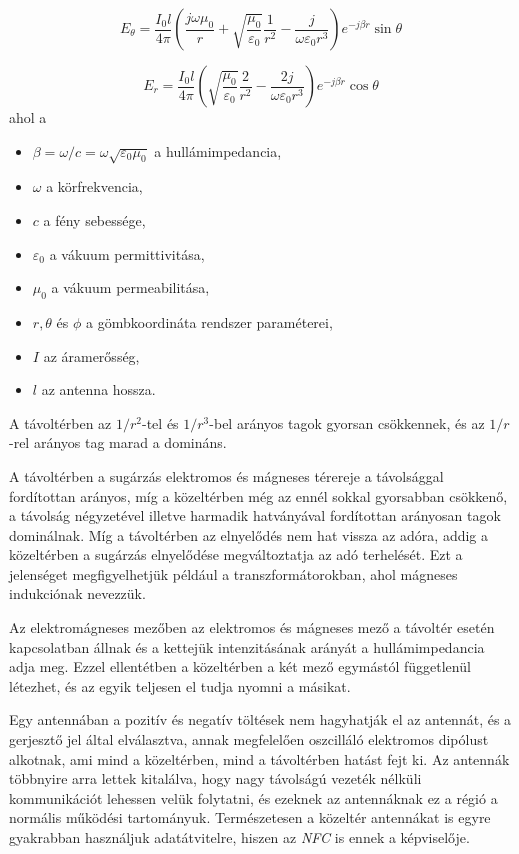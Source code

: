 \documentclass[12pt]{article}
\begin{document}
\begin{equation}
E_{\theta} = \frac{I_0 l}{4 \pi}
\left( \frac{j\omega \mu_0}{r}
+ \sqrt{\frac{\mu_0}{\varepsilon_0}}\frac{1}{r^2}
- \frac{j}{\omega \varepsilon_0 r^3} \right)
e^{-j\beta r} \sin \theta
\end{equation}

\begin{equation}
E_{r} = \frac{I_0 l}{4 \pi}
\left( \sqrt{\frac{\mu_0}{\varepsilon_0}} \frac{2}{r^2}
- \frac{2j}{\omega \varepsilon_0 r^3}\right)
e^{-j\beta r} \cos \theta
\end{equation}
ahol a 
\begin{itemize}
\item $\beta = \omega /c = \omega \sqrt{\varepsilon_0 \mu_0}$ a hullámimpedancia,
\item $\omega$ a körfrekvencia,
\item $c$ a fény sebessége,
\item $\varepsilon_0$ a vákuum permittivitása,
\item $\mu_0$ a vákuum permeabilitása,
\item $r, \theta$ és  $\phi$ a gömbkoordináta rendszer paraméterei,
\item $I$ az áramerősség,
\item $l$ az antenna hossza.
\end{itemize} 

A távoltérben az ${1}/{r^2}$-tel és ${1}/{r^3}$-bel arányos tagok
gyorsan csökkennek, és az ${1}/{r}$-rel arányos tag marad a domináns.

A távoltérben a sugárzás elektromos és mágneses térereje a 
távolsággal fordítottan arányos, 
míg a közeltérben még az ennél sokkal gyorsabban csökkenő, a távolság négyzetével illetve 
harmadik hatványával fordítottan arányosan tagok dominálnak.
Míg a távoltérben az elnyelődés nem hat vissza az adóra, addig a közeltérben a sugárzás
elnyelődése megváltoztatja az adó terhelését. Ezt a jelenséget megfigyelhetjük
például a transzformátorokban, ahol mágneses indukciónak nevezzük.

Az elektromágneses mezőben az elektromos és mágneses mező a távoltér esetén kapcsolatban
állnak és a kettejük intenzitásának arányát a hullámimpedancia adja meg. 
Ezzel ellentétben a közeltérben a két mező egymástól függetlenül létezhet, és
az egyik teljesen el tudja nyomni a másikat.

Egy antennában a pozitív és negatív töltések nem hagyhatják el az antennát, és a 
gerjesztő jel által elválasztva, annak megfelelően oszcilláló elektromos dipólust
alkotnak, ami mind a közeltérben, mind a távoltérben hatást fejt ki. Az antennák
többnyire arra lettek kitalálva, hogy nagy távolságú vezeték nélküli kommunikációt
lehessen velük folytatni, és ezeknek az antennáknak ez a régió a normális működési
tartományuk. Természetesen a közeltér antennákat is egyre gyakrabban használjuk
adatátvitelre, hiszen az \emph{NFC} is ennek a képviselője.
\end{document}
